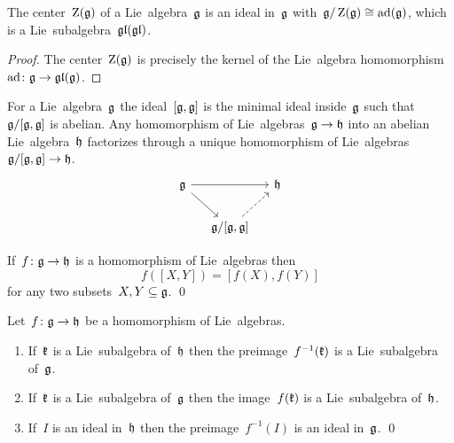 \begin{corollary}
  The center~$\operatorname{Z}(\mathfrak{g})$ of a Lie~algebra~$\mathfrak{g}$ is an ideal in~$\mathfrak{g}$ with~$\mathfrak{g}/\operatorname{Z}(\mathfrak{g}) \cong \operatorname{ad}(\mathfrak{g})$, which is a Lie~subalgebra~$\mathfrak{gl}(\mathfrak{gl})$.
\end{corollary}


\begin{proof}
  The center~$\operatorname{Z}(\mathfrak{g})$ is precisely the kernel of the Lie~algebra homomorphism~$\operatorname{ad} \colon \mathfrak{g} \to \mathfrak{gl}(\mathfrak{g})$.
\end{proof}


\begin{remark}
  For a Lie~algebra~$\mathfrak{g}$ the ideal~$[\mathfrak{g},\mathfrak{g}]$ is the minimal ideal inside~$\mathfrak{g}$ such that~$\mathfrak{g}/[\mathfrak{g},\mathfrak{g}]$ is abelian.
  Any homomorphism of Lie~algebras~$\mathfrak{g} \to \mathfrak{h}$ into an abelian Lie~algebra~$\mathfrak{h}$ factorizes through a unique homomorphism of Lie~algebras~$\mathfrak{g}/[\mathfrak{g}, \mathfrak{g}] \to \mathfrak{h}$.
  \[
    \begin{tikzcd}[column sep = small]
      \glie
      \arrow{rr}
      \arrow{dr}
      &
      {}
      &
      \hlie
      \\
      {}
      &
      \glie/[\glie,\glie]
      \arrow[dashed]{ur}
      &
      {}
    \end{tikzcd}
  \]
\end{remark}


\begin{lemma}
  \label{homomorphisms respect commutators of sets}
  If~$f \colon \mathfrak{g} \to \mathfrak{h}$ is a homomorphism of Lie~algebras then
  \[
    f([X,Y])
    =
    [f(X), f(Y)]
  \]
  for any two subsets~$X, Y \subseteq \mathfrak{g}$.
  \qed
\end{lemma}


\begin{lemma}
  Let~$f \colon \mathfrak{g} \to \mathfrak{h}$ be a homomorphism of Lie~algebras.
  \begin{enumerate}
    \item
      If~$\mathfrak{k}$ is a Lie~subalgebra of~$\mathfrak{h}$ then the preimage~$f^{-1}(\mathfrak{k})$ is a Lie~subalgebra of~$\mathfrak{g}$.
    \item
      If~$\mathfrak{k}$ is a Lie~subalgebra of~$\mathfrak{g}$ then the image~$f(\mathfrak{k})$ is a Lie~subalgebra of~$\mathfrak{h}$.
    \item
      If~$I$ is an ideal in~$\mathfrak{h}$ then the preimage~$f^{-1}(I)$ is an ideal in~$\mathfrak{g}$.
    \qed
  \end{enumerate}
\end{lemma}


